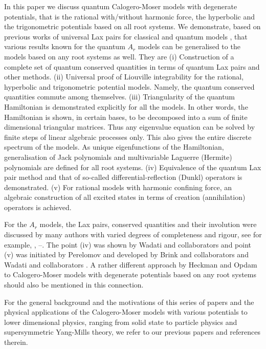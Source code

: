 \documentclass[a4paper,12pt]{article}
\begin{document}
In this paper we discuss quantum Calogero-Moser models with degenerate
potentials, that is the rational with/without harmonic force, the
hyperbolic and the trigonometric potentials based on all root systems.
We demonstrate, based on previous works of universal Lax pairs for
classical \cite{bcs1,bcs2,DHoker_Phong} and quantum models
\cite{bms}, that various results known for the quantum \(A_r\) models can
be generalised to  the models based on any root systems as well. They are
(i) Construction of a complete set of quantum conserved quantities in
terms of quantum Lax pairs and other methods.
(ii) Universal proof of Liouville integrability for the rational,
hyperbolic and trigonometric potential models.
Namely, the quantum conserved quantities commute among themselves.
(iii) Triangularity of the quantum Hamiltonian
is demonstrated explicitly for all the models.
In other words, the Hamiltonian is shown, in certain bases, to be
decomposed into a sum of finite dimensional triangular matrices.
Thus any eigenvalue equation can be solved by finite steps of linear
algebraic processes only. This also gives the entire discrete spectrum of
the models. As unique eigenfunctions of the Hamiltonian, generalisation of
Jack polynomials and multivariable Laguerre (Hermite) polynomials are
defined for all root systems.
(iv) Equivalence of the quantum Lax pair method and that of so-called
differential-reflection (Dunkl) operators \cite{Dunk} is demonstrated.
(v) For rational models with harmonic confining force, an algebraic
construction of all excited states in terms of creation (annihilation)
operators is achieved.

For the \(A_r\) models, the Lax pairs, conserved quantities and their
involution were discussed by many authors with varied degrees of
completeness and rigour, see for example,
\cite{OP2}, \cite{OP3}--\cite{Ruijs}.
The point (iv) was shown by Wadati and  collaborators \cite{UjWa}
and point (v) was initiated by Perelomov \cite{Pere1} and developed by
Brink and collaborators \cite{Br} and Wadati and  collaborators
\cite{UjWa}. A rather different approach by Heckman and Opdam
\cite{Heck2,HeOp} to Calogero-Moser models with degenerate potentials
based on any root systems should also be mentioned in this connection.

For the general background and the motivations of this
series of papers and the physical applications of the
Calogero-Moser models with various potentials to
lower dimensional physics, ranging from solid state to
particle physics and   supersymmetric Yang-Mills theory, we refer to our
previous papers \cite{bcs1,bcs2} and references therein.
\end{document}
